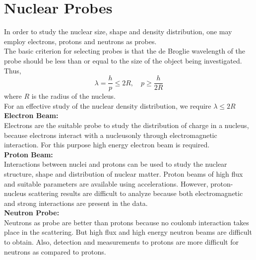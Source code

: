 \section{Nuclear Probes}
In order to study the nuclear size, shape and density distribution, one may employ electrons, protons and neutrons as probes.\\
The basic criterion for selecting probes is that the de Broglie wavelength of the probe should be less than or equal to the size of the object being investigated. Thus,
$$
\lambda=\frac{h}{p} \leq 2 R, \quad p \geq \frac{h}{2 R}
$$
where $R$ is the radius of the nucleus.\\
For an effective study of the nuclear density distribution, we require $\lambda \leq 2 R$\\
\textbf{Electron Beam:}\\
Electrons are the suitable probe to study the distribution of charge in a nucleus, because electrons interact with a nucleusonly through electromagnetic interaction. For this purpose high energy electron beam is required.\\
\textbf{Proton Beam:}\\
Interactions between nuclei and protons can be used to study the nuclear structure, shape and distribution of nuclear matter. Proton beams of high flux and suitable parameters are available using accelerations. However, proton-nucleus scattering results are difficult to analyze because both electromagnetic and strong interactions are present in the data.\\
\textbf{Neutron Probe:}\\
Neutrons as probe are better than protons because no coulomb interaction takes place in the scattering. But high flux and high energy neutron beams are difficult to obtain. Also, detection and measurements to protons are more difficult for neutrons as compared to protons.






